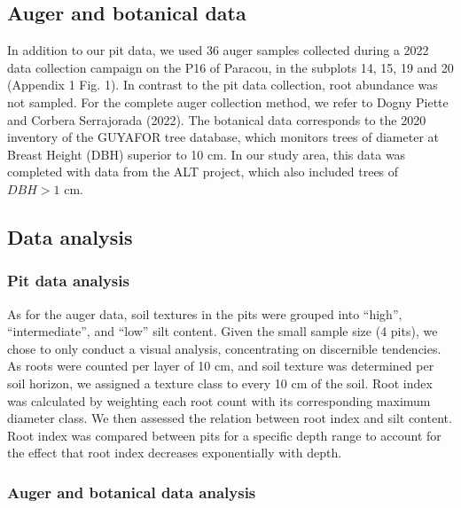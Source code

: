 \documentclass[fleqn,10pt]{latex/stylish_article} %
\begin{document}
\hypertarget{auger-and-botanical-data}{%
\subsection{Auger and botanical data}\label{auger-and-botanical-data}}

In addition to our pit data, we used 36 auger samples collected during a 2022 data collection campaign on the P16 of Paracou, in the subplots 14, 15, 19 and 20 (Appendix 1 Fig. 1). In contrast to the pit data collection, root abundance was not sampled. For the complete auger collection method, we refer to Dogny Piette and Corbera Serrajorada (2022).
The botanical data corresponds to the 2020 inventory of the GUYAFOR tree database, which monitors trees of diameter at Breast Height (DBH) superior to 10 cm. In our study area, this data was completed with data from the ALT project, which also included trees of \(DBH > 1\) cm.

\hypertarget{data-analysis}{%
\subsection{Data analysis}\label{data-analysis}}

\hypertarget{pit-data-analysis}{%
\subsubsection{Pit data analysis}\label{pit-data-analysis}}

As for the auger data, soil textures in the pits were grouped into \enquote{high}, \enquote{intermediate}, and \enquote{low} silt content. Given the small sample size (4 pits), we chose to only conduct a visual analysis, concentrating on discernible tendencies. As roots were counted per layer of 10 cm, and soil texture was determined per soil horizon, we assigned a texture class to every 10 cm of the soil.
Root index was calculated by weighting each root count with its corresponding maximum diameter class. We then assessed the relation between root index and silt content. Root index was compared between pits for a specific depth range to account for the effect that root index decreases exponentially with depth.

\hypertarget{auger-and-botanical-data-analysis}{%
\subsubsection{Auger and botanical data analysis}\label{auger-and-botanical-data-analysis}}
\end{document}
